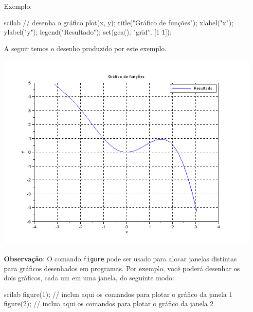 \documentclass[11pt,fleqn]{practice}
\begin{document}
\begin{enumerate}
   Exemplo:
   \begin{lst}{scilab}
// desenha o gráfico
plot(x, y);
title("Gráfico de funções");
xlabel("x");
ylabel("y");
legend("Resultado");
set(gca(), "grid", [1 1]);
   \end{lst}
   A seguir temos o desenho produzido por este exemplo.
   \begin{center}
     \includegraphics[width=\linewidth]{images/grafico}
   \end{center}
\end{enumerate}

\textbf{Observação}: O comando \texttt{figure} pode ser usado para
alocar janelas distintas para gráficos desenhados em programas. Por
exemplo, você poderá desenhar os dois gráficos, cada um em uma janela,
do seguinte modo:

\begin{lst}{scilab}
figure(1);
// inclua aqui os comandos para plotar o gráfico da janela 1
figure(2);
// inclua aqui os comandos para plotar o gráfico da janela 2
\end{lst}

\pagebreak
\end{document}
